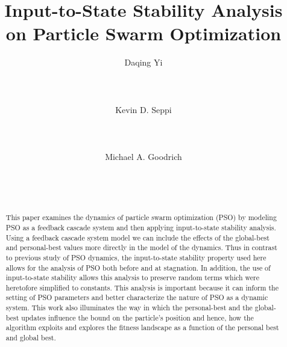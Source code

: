 \documentclass{sig-alternate}
\begin{document}
\title{Input-to-State Stability Analysis on Particle Swarm Optimization}


\author{
\alignauthor
Daqing Yi \\
 \\
\\
\\
\alignauthor
Kevin D. Seppi \\
 \\
\\
\\
\alignauthor
Michael A. Goodrich \\
	\\
\\
\\
}

\maketitle

\begin{abstract}
This paper examines the dynamics of particle swarm optimization (PSO) by modeling PSO as a feedback cascade system and then applying input-to-state stability analysis.
Using a feedback cascade system model we can include the effects of the global-best and personal-best values more directly in the model of the dynamics.
Thus in contrast to previous study of PSO dynamics, the input-to-state stability property used here allows for the analysis of PSO both before and at stagnation.
In addition, the use of input-to-state stability allows this analysis to preserve random terms which were heretofore simplified to constants.
This analysis is important because it can inform the setting of PSO parameters and better characterize the nature of PSO as a dynamic system.
This work also illuminates the way in which the personal-best and the global-best updates influence the bound on the particle's position and hence, how the algorithm exploits and explores the fitness landscape as a function of the personal best and global best.
\end{abstract}
\end{document}
